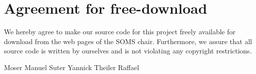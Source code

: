 
\section*{Agreement for free-download}
\bigskip


\bigskip


\large We hereby agree to make our source code for this project freely available for download from the web pages of the SOMS chair. Furthermore, we assure that all source code is written by ourselves and is not violating any copyright restrictions.


\begin{center}
\vspace{3cm}
Moser Manuel \hspace{3cm} Suter Yannick \hspace{3cm} Theiler Raffael

\end{center}

